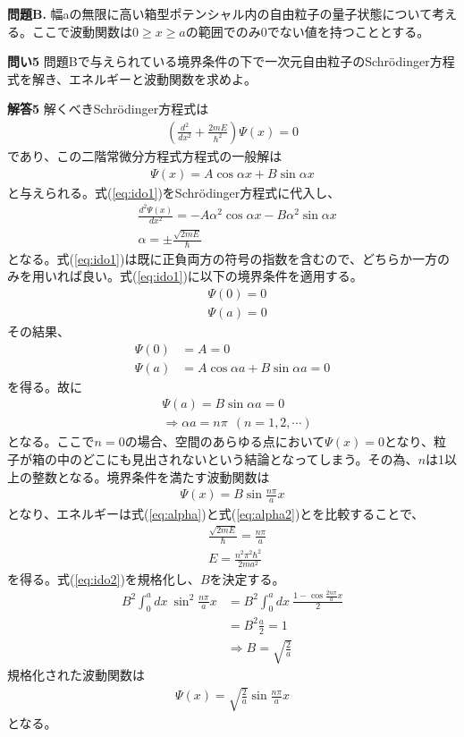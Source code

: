 \documentclass[11pt,pra,aps]{revtex4}
\begin{document}
\noindent
{\bf 問題B.} 幅aの無限に高い箱型ポテンシャル内の自由粒子の量子状態について考える。ここで波動関数は$0\geq x\geq a$の範囲でのみ0でない値を持つこととする。

\noindent
{\bf 問い5} 問題Bで与えられている境界条件の下で一次元自由粒子のSchr\"odinger方程式を解き、エネルギーと波動関数を求めよ。

\noindent
{\bf 解答5} 解くべきSchr\"odinger方程式は
\begin{align}
  \left(\frac{d^2}{dx^2}+\frac{2mE}{\hbar^2}\right)\Psi(x)=0 \label{eq:ido0}
\end{align}
であり、この二階常微分方程式方程式の一般解は
\begin{align}
  \Psi(x)=A\cos\alpha x + B\sin\alpha x \label{eq:ido1}
\end{align}
と与えられる。式(\ref{eq:ido1})をSchr\"odinger方程式に代入し、
\begin{align}
  &\frac{d^2\Psi(x)}{dx^2}=-A\alpha^2\cos\alpha x-B\alpha^2\sin\alpha x \\
  &\alpha=\pm\frac{\sqrt{2mE}}{\hbar}\label{eq:alpha}
\end{align}
となる。式(\ref{eq:ido1})は既に正負両方の符号の指数を含むので、どちらか一方のみを用いれば良い。式(\ref{eq:ido1})に以下の境界条件を適用する。
\begin{align}
  &\Psi(0)=0 \\
  &\Psi(a)=0
\end{align}
その結果、
\begin{align}
  \Psi(0)&=A= 0 \\
  \Psi(a)&=A\cos\alpha a + B\sin\alpha a = 0
\end{align}
を得る。故に
\begin{align}
  &\Psi(a)=B\sin\alpha a = 0 \\
  &\Rightarrow \alpha a = n\pi \ \ (n=1,2,\cdots) \label{eq:alpha2}
\end{align}
となる。ここで$n=0$の場合、空間のあらゆる点において$\Psi(x)=0$となり、粒子が箱の中のどこにも見出されないという結論となってしまう。その為、$n$は1以上の整数となる。境界条件を満たす波動関数は
\begin{align}
  \Psi(x)=B\sin\frac{n\pi}{a} x \label{eq:ido2}
\end{align}
となり、エネルギーは式(\ref{eq:alpha})と式(\ref{eq:alpha2})とを比較することで、
\begin{align}
  &\frac{\sqrt{2mE}}{\hbar}=\frac{n\pi}{a}\\
  &E=\frac{n^2\pi^2\hbar^2}{2ma^2}
\end{align}
を得る。式(\ref{eq:ido2})を規格化し、$B$を決定する。
\begin{align}
  B^2\int_0^a dx \ \sin^2\frac{n\pi}{a}x &= B^2\int_0^a dx \ \frac{1-\cos\frac{2n\pi}{a}x}{2} \nonumber \\
  &=B^2\frac{a}{2}=1 \\
  &\Rightarrow B=\sqrt{\frac{2}{a}}
\end{align}
規格化された波動関数は
\begin{align}
  \Psi(x)=\sqrt{\frac{2}{a}}\sin\frac{n\pi}{a} x \label{eq:ido3}
\end{align}
となる。
\end{document}
